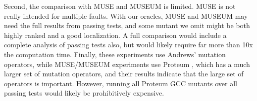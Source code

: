 Second, the comparison with MUSE and MUSEUM is limited.  MUSE is not really intended for multiple faults.  With our oracles, MUSE and MUSEUM may need the full results from passing tests, and some mutant we omit might be both highly ranked and a good localization.  A full comparison would include a complete analysis of passing tests also, but would likely require far more than 10x the computation time.  Finally, these experiments use Andrews' mutation operators, while MUSE/MUSEUM experiments use Proteum \cite{Proteum}, which has a much larger set of mutation operators, and their results indicate that the large set of operators is important.  However, running all Proteum GCC mutants over all passing tests would likely be prohibitively expensive.
